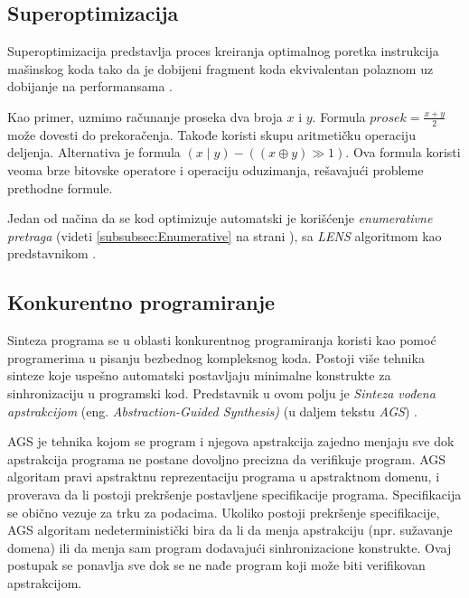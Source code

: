 \subsection{Superoptimizacija}
\label{subsec:Superoptimizacija}

Superoptimizacija predstavlja proces kreiranja optimalnog poretka instrukcija mašinskog koda tako da je dobijeni fragment koda ekvivalentan polaznom uz dobijanje na performansama \cite{Superoptimizer}.

Kao primer, uzmimo računanje proseka dva broja $x$ i $y$. Formula $\mathit{prosek} = \frac{x+y}{2}$ može dovesti do prekoračenja. Takođe koristi skupu aritmetičku operaciju deljenja. Alternativa je formula $(x \mid y)-((x \oplus y) \gg 1)$. Ova formula koristi veoma brze bitovske operatore i operaciju oduzimanja, rešavajući probleme prethodne formule.

Jedan od načina da se kod optimizuje automatski je korišćenje  \emph{enumerativne pretraga} (videti \ref{subsubsec:Enumerative} na strani \pageref{subsubsec:Enumerative}), sa \emph{LENS} algoritmom kao predstavnikom \cite{ScalingUpSuperoptimization}.


\subsection{Konkurentno programiranje}
\label{subsec:KonkurentnoProgramiranje}

Sinteza programa se u oblasti konkurentnog programiranja koristi kao pomoć programerima u pisanju bezbednog kompleksnog koda. Postoji više tehnika sinteze koje uspešno automatski postavljaju minimalne konstrukte za sinhronizaciju u programski kod. Predstavnik u ovom polju je \emph{Sinteza vođena apstrakcijom} (eng. \emph{Abstraction-Guided Synthesis)} (u daljem tekstu \emph{AGS})  \cite{AGS}.

AGS je tehnika kojom se program i njegova apstrakcija zajedno menjaju sve dok apstrakcija programa ne postane dovoljno precizna da verifikuje program. AGS algoritam pravi apstraktnu reprezentaciju programa u apstraktnom domenu, i proverava da li postoji prekršenje postavljene specifikacije programa. Specifikacija se obično vezuje za trku za podacima. Ukoliko postoji prekršenje specifikacije, AGS algoritam nedeterministički bira da li da menja apstrakciju (npr. sužavanje domena) ili da menja sam program dodavajući sinhronizacione konstrukte. Ovaj postupak se ponavlja sve dok se ne nađe program koji može biti verifikovan apstrakcijom.
